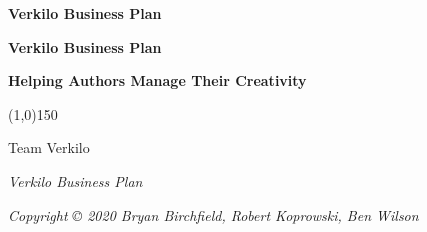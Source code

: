 \documentclass[10pt,openany]{book}
\begin{document}
  \sloppy %
  \setcounter{page}{1}
  \pagestyle{empty}
  \begin{center}
    \vspace*{\fill}

    \LARGE\textbf{\textsf{Verkilo Business Plan}}

    \vspace*{\fill}
    \vspace*{\fill}
  \end{center}
  \clearpage

  \newpage
  \emph{ }\newline
    \clearpage

  \begin{center}
    \vspace*{\fill}

    \Huge\textbf{\textsf{Verkilo Business Plan}}
    
    \vspace*{0.125in}
    \Large\textbf{\textsf{Helping Authors Manage Their Creativity}}
    
    \vspace*{0.25in}
    \line(1,0){150}
    \vspace*{0.25in}

    \Large\textsf{Team Verkilo}

    \vspace*{\fill}
    \vspace*{\fill}
      \end{center}
  \clearpage

  \vspace*{\fill}

  \par\noindent\emph{Verkilo Business Plan}\newline
  \par\noindent\emph{Copyright © 2020 Bryan Birchfield, Robert
Koprowski, Ben Wilson}\newline
\end{document}
